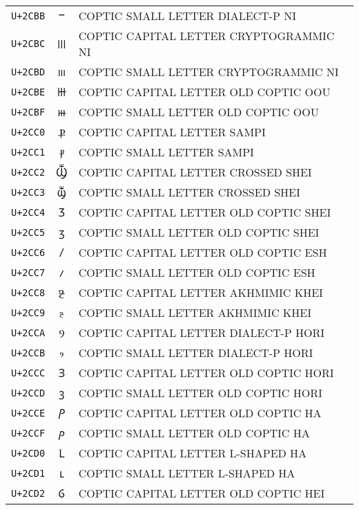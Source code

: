 \documentclass[10pt,a4paper]{article}
\newcommand{\coptic}[1]{{\copticfont #1}}
\begin{document}
\begin{longtable}{C C L}
\texttt{U+2CBB} & \coptic{ⲻ} & COPTIC SMALL LETTER DIALECT-P NI \\
\texttt{U+2CBC} & \coptic{Ⲽ} & COPTIC CAPITAL LETTER CRYPTOGRAMMIC NI \\
\texttt{U+2CBD} & \coptic{ⲽ} & COPTIC SMALL LETTER CRYPTOGRAMMIC NI \\
\texttt{U+2CBE} & \coptic{Ⲿ} & COPTIC CAPITAL LETTER OLD COPTIC OOU \\
\texttt{U+2CBF} & \coptic{ⲿ} & COPTIC SMALL LETTER OLD COPTIC OOU \\
\texttt{U+2CC0} & \coptic{Ⳁ} & COPTIC CAPITAL LETTER SAMPI \\
\texttt{U+2CC1} & \coptic{ⳁ} & COPTIC SMALL LETTER SAMPI \\
\texttt{U+2CC2} & \coptic{Ⳃ} & COPTIC CAPITAL LETTER CROSSED SHEI \\
\texttt{U+2CC3} & \coptic{ⳃ} & COPTIC SMALL LETTER CROSSED SHEI \\
\texttt{U+2CC4} & \coptic{Ⳅ} & COPTIC CAPITAL LETTER OLD COPTIC SHEI \\
\texttt{U+2CC5} & \coptic{ⳅ} & COPTIC SMALL LETTER OLD COPTIC SHEI \\
\texttt{U+2CC6} & \coptic{Ⳇ} & COPTIC CAPITAL LETTER OLD COPTIC ESH \\
\texttt{U+2CC7} & \coptic{ⳇ} & COPTIC SMALL LETTER OLD COPTIC ESH \\
\texttt{U+2CC8} & \coptic{Ⳉ} & COPTIC CAPITAL LETTER AKHMIMIC KHEI \\
\texttt{U+2CC9} & \coptic{ⳉ} & COPTIC SMALL LETTER AKHMIMIC KHEI \\
\texttt{U+2CCA} & \coptic{Ⳋ} & COPTIC CAPITAL LETTER DIALECT-P HORI \\
\texttt{U+2CCB} & \coptic{ⳋ} & COPTIC SMALL LETTER DIALECT-P HORI \\
\texttt{U+2CCC} & \coptic{Ⳍ} & COPTIC CAPITAL LETTER OLD COPTIC HORI \\
\texttt{U+2CCD} & \coptic{ⳍ} & COPTIC SMALL LETTER OLD COPTIC HORI \\
\texttt{U+2CCE} & \coptic{Ⳏ} & COPTIC CAPITAL LETTER OLD COPTIC HA \\
\texttt{U+2CCF} & \coptic{ⳏ} & COPTIC SMALL LETTER OLD COPTIC HA \\
\texttt{U+2CD0} & \coptic{Ⳑ} & COPTIC CAPITAL LETTER L-SHAPED HA \\
\texttt{U+2CD1} & \coptic{ⳑ} & COPTIC SMALL LETTER L-SHAPED HA \\
\texttt{U+2CD2} & \coptic{Ⳓ} & COPTIC CAPITAL LETTER OLD COPTIC HEI \\

\end{longtable}
\end{document}
